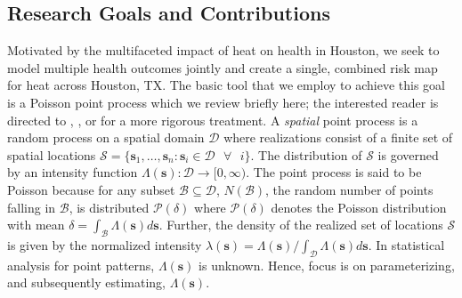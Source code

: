 \documentclass[final]{statsoc}
\begin{document}
\subsection{Research Goals and Contributions}
Motivated by the multifaceted impact of heat on health in Houston, we seek to model multiple health outcomes jointly and create a single, combined risk map for heat across Houston, TX.  The basic tool that we employ to achieve this goal is a Poisson point process which we review briefly here; the interested reader is directed to \cite{Moller2003}, \cite{Gelfand2010}, 
or \cite{Banerjee2014} for a more rigorous treatment.  
A \textit{spatial} point process is a random process on a 
spatial domain $\mathcal{D}$ where realizations consist of a finite 
set of spatial locations $\mathcal{S} = \{\mathbf{s}_1,\dots,\mathbf{s}_n: 
\mathbf{s}_i \in \mathcal{D}\text{ }\forall\text{ } i\}$. The distribution of 
$\mathcal{S}$ is governed by an intensity function $\Lambda(\mathbf{s}): 
\mathcal{D} \rightarrow [0, \infty)$.  The point process is said to be 
Poisson because for any subset $\mathcal{B} \subseteq \mathcal{D}$,
 $N(\mathcal{B})$, the random number of points falling in $\mathcal{B}$,
is distributed $\mathcal{P}(\delta)$ where $\mathcal{P}(\delta)$ denotes
the Poisson distribution with mean $\delta = \int_{\mathcal{B}} \Lambda(\mathbf{s})d\mathbf{s}$.
Further, the density of the realized set of locations $\mathcal{S}$ is given 
by the normalized intensity
$\lambda(\mathbf{s}) = \Lambda(\mathbf{s})/\int_\mathcal{D}\Lambda(\mathbf{s})d\mathbf{s}$.   
In statistical analysis for point patterns, $\Lambda(\mathbf{s})$ is unknown.  Hence, 
focus is on parameterizing, and subsequently estimating, $\Lambda(\mathbf{s})$. 
\end{document}
